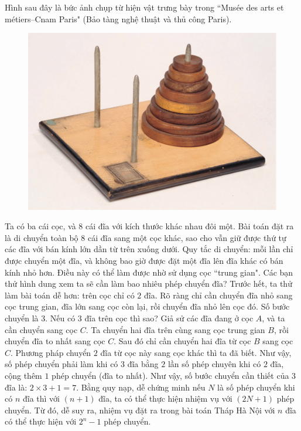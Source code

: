 \begin{multicols}{2}
	\vskip 0.1cm
	Hình sau đây là bức ảnh chụp từ hiện vật trưng bày trong ``Musée des arts et métiers--Cnam Paris" (Bảo tàng nghệ thuật và thủ công Paris). 
	\begin{figure}[H]
		\centering
		\vspace*{-5pt}
		\captionsetup{labelformat= empty, justification=centering}
		\includegraphics[width=1\linewidth]{2.1}
		\vspace*{-15pt} 
	\end{figure}
	Ta có ba cái cọc, và  $8$ cái đĩa với kích thước khác nhau đôi một. Bài toán đặt ra là di chuyển toàn bộ $8$ cái đĩa sang một cọc khác, sao cho vẫn giữ được thứ tự các đĩa với bán kính lớn dần từ trên xuống dưới. Quy tắc di chuyển: mỗi lần chỉ được chuyển một đĩa, và không bao giờ được đặt một đĩa lên đĩa khác có bán kính nhỏ hơn. Điều này có thể làm được nhờ sử dụng cọc ``trung gian".
	\vskip 0.1cm
	Các bạn thử hình dung xem ta sẽ cần làm bao nhiêu phép chuyển đĩa?
	\vskip 0.1cm
	Trước hết, ta thử làm bài toán dễ hơn: trên cọc chỉ có $2$ đĩa. Rõ ràng chỉ cần chuyển đĩa nhỏ sang cọc trung gian, đĩa lớn sang cọc còn lại, rồi chuyển đĩa nhỏ lên cọc đó. Số bước chuyển là $3$.
	\vskip 0.1cm
	Nếu có $3$ đĩa trên cọc thì sao? Giả sử các đĩa đang ở cọc $A$, và ta cần chuyển sang cọc $C$. Ta chuyển hai đĩa trên cùng sang cọc  trung gian $B$, rồi chuyển đĩa to nhất sang cọc $C$. Sau đó chỉ cần chuyển hai đĩa từ cọc $B$ sang cọc $C$. Phương pháp chuyển $2$ đĩa từ cọc này sang cọc khác thì ta đã biết. Như vậy, số phép chuyển phải làm khi có $3$ đĩa bằng $2$ lần số phép chuyên khi có $2$ đĩa, cộng thêm $1$ phép chuyển (đĩa to nhất). 
	\vskip 0.1cm
	Như vậy, số bước chuyển cần thiết của $3$ đĩa là: $2\times 3 + 1 = 7$. Bằng quy nạp, dễ chứng minh nếu $N$ là số phép chuyển khi có $n$ đĩa thì với $(n+1)$ đĩa, ta có thể thực hiện nhiệm vụ với $(2N+1)$ phép chuyển. Từ đó, dễ suy ra, nhiệm vụ đặt ra trong bài toán Tháp Hà Nội với $n$ đĩa có thể thực hiện với $2^n- 1$  phép chuyển.

\end{multicols}
